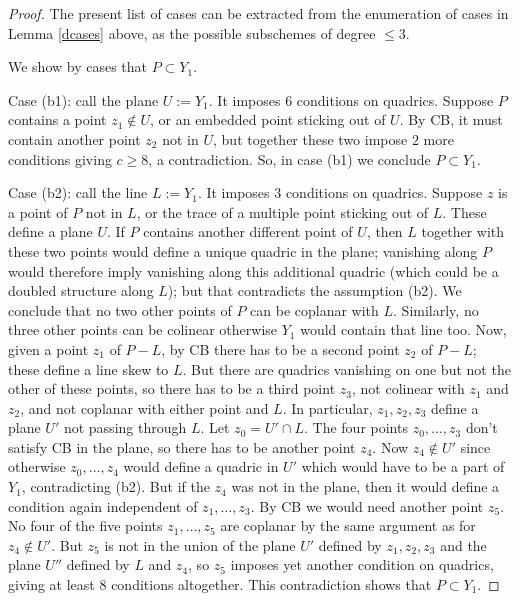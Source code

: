 \documentclass{amsart}
\theoremstyle{plain}
\numberwithin{equation}{section}
\begin{document}
\begin{proof}
The present list of cases can be extracted from the enumeration of cases in Lemma \ref{dcases} above,
as the possible subschemes of degree $\leq 3$.

We show by cases that $P\subset Y_1$. 

Case (b1): call the plane $U:=Y_1$. It imposes $6$ conditions on quadrics.
Suppose $P$ contains a point $z_1\not \in U$, or
an embedded point sticking out of $U$. By CB, it must contain another point 
$z_2$ not in $U$, but together these two impose $2$ more conditions  
giving $c\geq 8$, a contradiction. So, in case (b1) we conclude $P\subset Y_1$.

Case (b2): call the line $L:=Y_1$. It imposes $3$ conditions on quadrics.
Suppose $z$ is a point of $P$ not in $L$,
or the trace of a multiple point sticking out of $L$. These define a plane $U$.
If $P$ contains another different point of $U$, then $L$ together with these two points
would define a unique quadric in the plane; vanishing along $P$ would therefore 
imply vanishing along this additional quadric (which could be a doubled structure along $L$);
but that contradicts the assumption (b2). We conclude that no two other points of 
$P$ can be coplanar with $L$. Similarly, no three other points can be colinear otherwise
$Y_1$ would contain that line too.
Now, given a point $z_1$ of $P-L$, by CB there has to
be a second point $z_2$ of $P-L$; these define a line skew to $L$. 
But there are quadrics vanishing on one but not the other of these points, so there
has to be a third point $z_3$, not colinear with $z_1$ and $z_2$, and not coplanar with
either point and $L$. In particular, $z_1,z_2,z_3$ define a plane $U'$ not passing
through $L$. Let $z_0=U'\cap L$. The four points $z_0,\ldots , z_3$ don't satisfy 
CB in the plane, so there has to be another point $z_4$. Now $z_4\not\in U'$ since
otherwise $z_0, \ldots , z_4$ would define a quadric in $U'$ which would have to be a part of $Y_1$, contradicting
(b2). But if the $z_4$ was not in the plane, then it would define a condition
again independent of $z_1,\ldots , z_3$. By CB we would need another point $z_5$.
No four of the five points $z_1,\ldots , z_5$ are coplanar by the same
argument as for $z_4\not\in U'$. But $z_5$
is not in the union of the plane $U'$ defined by $z_1,z_2,z_3$ and the plane $U''$ defined
by $L$ and $z_4$, so $z_5$ imposes yet another condition on quadrics, giving at least
$8$ conditions altogether. This contradiction shows that $P\subset Y_1$.


\end{proof}
\end{document}
